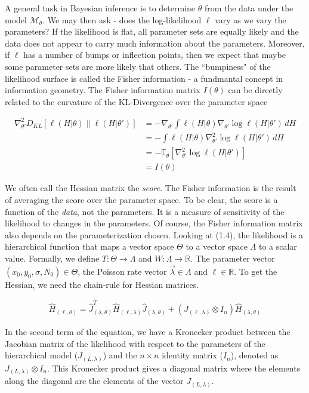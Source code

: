 \documentclass{ucetd}
\begin{document}
A general task in Bayesian inference is to determine $\theta$ from the data under the model $\mathcal{M}_{\theta}$. We may then ask - does the log-likelihood $\ell$ vary as we vary the parameters? If the likelihood is flat, all parameter sets are equally likely and the data does not appear to carry much information about the parameters. Moreover, if $\ell$ has a number of bumps or inflection points, then we expect that maybe some parameter sets are more likely that others. The ``bumpiness" of the likelihood surface is called the Fisher information - a fundmantal concept in information geometry. The Fisher information matrix $I(\theta)$ can be directly related to the curvature of the KL-Divergence over the parameter space

\begin{align*}
\nabla^2_{\theta'} D_{KL}[\ell(H|\theta) \parallel \ell(H|\theta')] 
&= - \nabla_{\theta'} \int \ell(H|\theta) \nabla_{\theta'}  \log \ell(H|\theta') \, dH \\ 
&= - \int \ell(H|\theta) \nabla^2_{\theta'}  \log \ell(H|\theta') \, dH \\
&= - \mathbb{E}_{\theta}[\nabla^2_{\theta'} \log \ell(H|\theta')] \\
&= I(\theta)
\end{align*}


We often call the Hessian matrix the \emph{score}. The Fisher information is the result of averaging the score over the parameter space. To be clear, the score is a function of the \emph{data}, not the parameters. It is a measure of sensitivity of the likelihood to changes in the parameters. Of course, the Fisher information matrix also depends on the parameterization chosen. Looking at (1.4), the likelihood is a hierarchical function that maps a vector space $\Theta$ to a vector space $\Lambda$ to a scalar value. Formally, we define $T: \Theta \rightarrow \Lambda$ and $W: \Lambda \rightarrow \mathbb{R}$. The parameter vector $(x_{0},y_{0},\sigma, N_{0})\in \Theta$, the Poisson rate vector $\vec{\lambda} \in \Lambda$ and $\ell \in \mathbb{R}$. To get the Hessian, we need the chain-rule for Hessian matrices.


\begin{align*}
\hat{H}_{(\ell,\theta)} = \hat{J}_{(\lambda,\theta)}^{T} \hat{H}_{(\ell,\lambda)} \hat{J}_{(\lambda,\theta)} + (J_{(\ell,\lambda)}\otimes I_{n})\hat{H}_{(\lambda,\theta)}
\end{align*}

In the second term of the equation, we have a Kronecker product between the Jacobian matrix of the likelihood with respect to the parameters of the hierarchical model ($J_{(L,\lambda)}$) and the $n\times n$ identity matrix ($I_n$), denoted as $J_{(L,\lambda)}\otimes I_n$. This Kronecker product gives a diagonal matrix where the elements along the diagonal are the elements of the vector $J_{(L,\lambda)}$.
\end{document}
